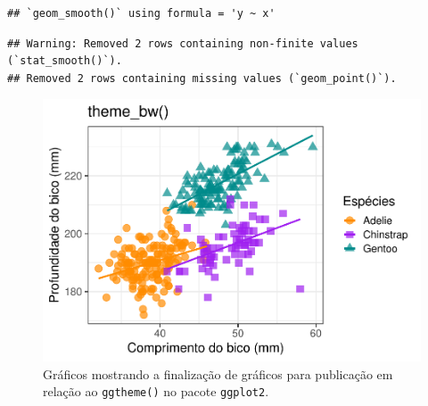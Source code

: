 \documentclass[
]{article}
\begin{document}
\begin{verbatim}
## `geom_smooth()` using formula = 'y ~ x'
\end{verbatim}

\begin{verbatim}
## Warning: Removed 2 rows containing non-finite values (`stat_smooth()`).
## Removed 2 rows containing missing values (`geom_point()`).
\end{verbatim}

\begin{figure}
\centering
\includegraphics{epr_files/figure-latex/fig-plot-final-ggtheme-2.pdf}
\caption{\label{fig:fig-plot-final-ggtheme-2}Gráficos mostrando a finalização de gráficos para publicação em relação ao \texttt{ggtheme()} no pacote \texttt{ggplot2}.}
\end{figure}
\end{document}
